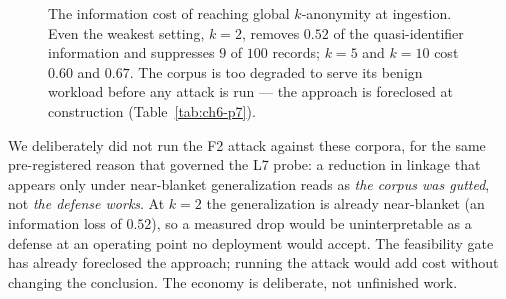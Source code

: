 \begin{figure}[h]
\centering
{}
\caption[The information cost of ingestion-time $k$-anonymity (P7)]{The information cost of
reaching global $k$-anonymity at ingestion. Even the weakest setting, $k{=}2$, removes $0.52$ of
the quasi-identifier information and suppresses $9$ of $100$ records; $k{=}5$ and $k{=}10$ cost
$0.60$ and $0.67$. The corpus is too degraded to serve its benign workload before any attack is
run --- the approach is foreclosed at construction (Table~\ref{tab:ch6-p7}).}
\label{fig:ch6-p7infoloss}
\end{figure}

We deliberately did not run the F2 attack against these corpora, for the same pre-registered reason that
governed the L7 probe: a reduction in linkage that appears only under near-blanket generalization reads as
\emph{the corpus was gutted}, not \emph{the defense works}. At $k=2$ the generalization is already
near-blanket (an information loss of $0.52$), so a measured drop would be uninterpretable as a defense at
an operating point no deployment would accept. The feasibility gate has already foreclosed the approach;
running the attack would add cost without changing the conclusion. The economy is deliberate, not
unfinished work.

